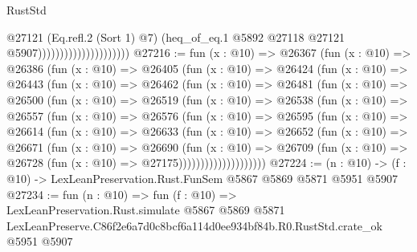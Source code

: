 \begin{lexlean}{RustStd}
\begin{coremodule}
                                            @27121
                                            (Eq.refl.{2} (Sort 1) @7)
                                            (heq_of_eq.{1}
                                              @5892
                                              @27118
                                              @27121
                                              @5907)))))))))))))))))))))
@27216 := fun (x : @10) =>
  @26367
    (fun (x : @10) =>
    @26386
      (fun (x : @10) =>
      @26405
        (fun (x : @10) =>
        @26424
          (fun (x : @10) =>
          @26443
            (fun (x : @10) =>
            @26462
              (fun (x : @10) =>
              @26481
                (fun (x : @10) =>
                @26500
                  (fun (x : @10) =>
                  @26519
                    (fun (x : @10) =>
                    @26538
                      (fun (x : @10) =>
                      @26557
                        (fun (x : @10) =>
                        @26576
                          (fun (x : @10) =>
                          @26595
                            (fun (x : @10) =>
                            @26614
                              (fun (x : @10) =>
                              @26633
                                (fun (x : @10) =>
                                @26652
                                  (fun (x : @10) =>
                                  @26671
                                    (fun (x : @10) =>
                                    @26690
                                      (fun (x : @10) =>
                                      @26709
                                        (fun (x : @10) =>
                                        @26728 (fun (x : @10) => @27175))))))))))))))))))))
@27224 := (n : @10) -> (f : @10) -> LexLeanPreservation.Rust.FunSem @5867 @5869 @5871 @5951 @5907
@27234 := fun (n : @10) =>
  fun (f : @10) =>
  LexLeanPreservation.Rust.simulate
    @5867
    @5869
    @5871
    LexLeanPreserve.C86f2e6a7d0c8bcf6a114d0ee934bf84b.R0.RustStd.crate_ok
    @5951
    @5907
\end{coremodule}
\end{lexlean}
